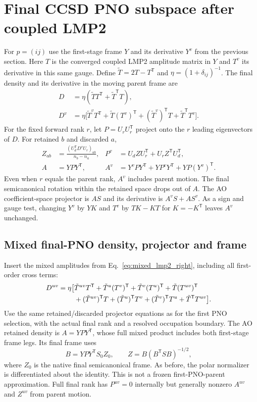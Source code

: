 \documentclass[11pt]{article}
\begin{document}
\section{Final CCSD PNO subspace after coupled LMP2}
For $p=(ij)$ use the first-stage frame $Y$ and its derivative $Y^v$ from
the previous section. Here $T$ is the converged coupled LMP2 amplitude
matrix in $Y$ and $T^v$ its derivative in this same gauge. Define
$\tilde T=2T-T^{\mathsf T}$ and $\eta=(1+\delta_{ij})^{-1}$.
The final density and its derivative in the moving parent frame are
\begin{align}
 D &=\eta(\tilde T T^{\mathsf T}+\tilde T^{\mathsf T}T),\\
 D^v&=\eta\big[\tilde T^v T^{\mathsf T}+\tilde T(T^v)^{\mathsf T}
        +(\tilde T^v)^{\mathsf T}T+\tilde T^{\mathsf T}T^v\big].
\end{align}
For the fixed forward rank $r$, let $P=U_rU_r^{\mathsf T}$ project onto the
$r$ leading eigenvectors of $D$. For retained $b$ and discarded $a$,
\begin{align}
 Z_{ab}&=\frac{(U_d^{\mathsf T}D^vU_r)_{ab}}{n_b-n_a},&
 P^v &= U_d Z U_r^{\mathsf T}+U_r Z^{\mathsf T} U_d^{\mathsf T},\\
 A &=Y P Y^{\mathsf T},&
 A^v &= Y^v P Y^{\mathsf T}+Y P^v Y^{\mathsf T}+YP(Y^v)^{\mathsf T}.
\end{align}
Even when $r$ equals the parent rank, $A^v$ includes parent motion.
The final semicanonical rotation within the retained space drops out of $A$.
The AO coefficient-space projector is $AS$ and its derivative is $A^v S+A S^v$.
As a sign and gauge test, changing $Y^v$ by $YK$ and $T^v$ by
$TK-KT$ for $K=-K^{\mathsf T}$ leaves $A^v$ unchanged.

\subsection{Mixed final-PNO density, projector and frame}
Insert the mixed amplitudes from Eq.~\eqref{eq:mixed_lmp2_right},
including all first-order cross terms:
\begin{align}
 D^{uv}=\eta\big[&\tilde T^{uv}T^{\mathsf T}
      +\tilde T^u(T^v)^{\mathsf T}+\tilde T^v(T^u)^{\mathsf T}
      +\tilde T(T^{uv})^{\mathsf T} \notag\\
      &+(\tilde T^{uv})^{\mathsf T}T
      +(\tilde T^u)^{\mathsf T}T^v+(\tilde T^v)^{\mathsf T}T^u
      +\tilde T^{\mathsf T}T^{uv}\big].
\end{align}
Use the same retained/discarded projector equations as for the first PNO
selection, with the actual final rank and a resolved occupation boundary.
The AO retained density is $A=YPY^{\mathsf T}$, whose full mixed product
includes both first-stage frame legs. Its final frame uses
\begin{equation}
 B=YPY^{\mathsf T}S_0Z_0,\qquad Z=B(B^{\mathsf T}SB)^{-1/2},
\end{equation}
where $Z_0$ is the native final semicanonical frame. As before, the polar
normalizer is differentiated about the identity. This is not a frozen
first-PNO-parent approximation. Full final rank has $P^{uv}=0$ internally
but generally nonzero $A^{uv}$ and $Z^{uv}$ from parent motion.
\end{document}
